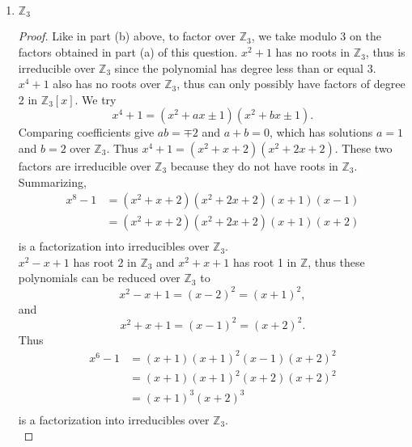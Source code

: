 \documentclass{article}
\begin{document}
\begin{enumerate}[label={(\alph*)}]
\begin{proof}
        The factors $x^2-x+1$ and $x^2+x+1$ do not have roots in
        $\mathbb{Z}_2$ and since they are polynomials of degree 2, they are
        irreducible over $\mathbb{Z}_2$. Thus
        \begin{align*}
          x^6-1 &=(x+1)(x^2-x+1)(x-1)(x^2+x+1) \\
          &=(x+1)(x^2+x+1)(x+1)(x^2+x+1) \\
          &=(x+1)^2(x^2+x+1)^2 \\
        \end{align*}
        is a factorization into irreducibles over $\mathbb{Z}_2$. \\
      \end{proof}

    \item $\mathbb{Z}_3$
      \begin{proof}
        Like in part (b) above, to factor over $\mathbb{Z}_3$, we take
        modulo 3 on the factors obtained in part (a) of this question.
        $x^2+1$ has no roots in $\mathbb{Z}_3$, thus is irreducible over
        $\mathbb{Z}_3$ since the polynomial has degree less than or equal
        3. $x^4+1$ also has no roots over $\mathbb{Z}_3$, thus can only
        possibly have factors of degree 2 in $\mathbb{Z}_3[x]$. We try
        \[x^4+1=(x^2+ax\pm1)(x^2+bx\pm1).\] Comparing coefficients give
        $ab=\mp2$ and $a+b=0$, which has solutions $a=1$ and $b=2$ over
        $\mathbb{Z}_3$. Thus $x^4+1=(x^2+x+2)(x^2+2x+2)$. These two
        factors are irreducible over $\mathbb{Z}_3$ because they do not
        have roots in $\mathbb{Z}_3$. Summarizing,
        \begin{align*}
          x^8-1 &=(x^2+x+2)(x^2+2x+2)(x+1)(x-1) \\
          &=(x^2+x+2)(x^2+2x+2)(x+1)(x+2) \\
        \end{align*}
        is a factorization into irreducibles over $\mathbb{Z}_3$. \\

        $x^2-x+1$ has root 2 in $\mathbb{Z}_3$ and $x^2+x+1$ has root 1 in
        $\mathbb{Z}$, thus these polynomials can be reduced over
        $\mathbb{Z}_3$ to
        \[x^2-x+1 = (x-2)^2=(x+1)^2,\] and
        \[x^2+x+1 = (x-1)^2=(x+2)^2.\]
        Thus
        \begin{align*}
          x^6-1 &=(x+1)(x+1)^2(x-1)(x+2)^2 \\
          &=(x+1)(x+1)^2(x+2)(x+2)^2 \\
          &=(x+1)^3(x+2)^3 \\
        \end{align*}
        is a factorization into irreducibles over $\mathbb{Z}_3$. \\
      \end{proof}
  \end{enumerate}
\end{document}
